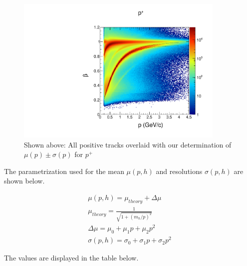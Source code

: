\begin{figure}
  \begin{center}
    \includegraphics[width=10cm]{image/plots/hadron-id/beautiful_pbeta_prot.pdf}
    \caption{ Shown above: All positive tracks overlaid with our determination of $\mu(p) \pm \sigma(p)$ for $p^+$}
  \end{center}
\end{figure}

The parametrization used for the mean $\mu (p,h)$ and resolutions $\sigma (p,h)$ are shown below.

\begin{eqnarray}  
  \mu (p,h) = \mu_{theory} + \Delta \mu       \\
  \mu_{theory} = \frac{1}{\sqrt{1+(m_h/p)^2}} \\
  \Delta \mu = \mu_0 + \mu_1 p + \mu_2 p^2    \\
  \sigma (p,h) = \sigma_0 + \sigma_1 p + \sigma_2 p^2
\end{eqnarray}

The values are displayed in the table below. 

